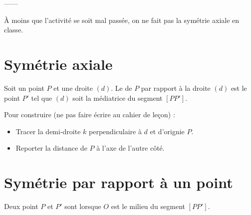 


------

À moins que l'activité se soit mal passée, on ne fait pas la symétrie axiale en classe.

\section*{Symétrie axiale}

\begin{definition}
    Soit un point \( P\) et une droite \( (d)\). Le  de \( P\) par rapport à la droite \( (d)\) est le point \( P'\) tel que \( (d)\) soit la médiatrice du segment \( [PP']\).
\end{definition}

Pour construire (ne pas faire écrire au cahier de leçon) :
\begin{itemize}
    \item Tracer la demi-droite \( k\) perpendiculaire à \( d\) et d'orignie \( P\).
    \item Reporter la distance de \( P\) à l'axe de l'autre côté.
\end{itemize}

\section{Symétrie par rapport à un point}



\begin{definition}
    Deux point \( P\) et \( P'\) sont  lorsque \( O\) est le milieu du segment \( [PP']\). 
\end{definition}

